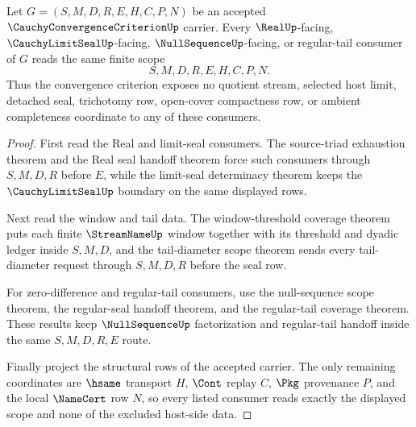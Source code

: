 \begin{theorem}
\label{thm:cauchy-convergence-criterion-scoped-readback-strengthening}
Let $G=(S,M,D,R,E,H,C,P,N)$ be an accepted $\CauchyConvergenceCriterionUp$ carrier. Every $\RealUp$-facing, $\CauchyLimitSealUp$-facing, $\NullSequenceUp$-facing, or regular-tail consumer of $G$ reads the same finite scope
$$
S,M,D,R,E,H,C,P,N.
$$
Thus the convergence criterion exposes no quotient stream, selected host limit, detached seal, trichotomy row, open-cover compactness row, or ambient completeness coordinate to any of these consumers.
\end{theorem}
\begin{proof}
First read the Real and limit-seal consumers. The source-triad exhaustion theorem and the Real seal handoff theorem force such consumers through $S,M,D,R$ before $E$, while the limit-seal determinacy theorem keeps the $\CauchyLimitSealUp$ boundary on the same displayed rows.

Next read the window and tail data. The window-threshold coverage theorem puts each finite $\StreamNameUp$ window together with its threshold and dyadic ledger inside $S,M,D$, and the tail-diameter scope theorem sends every tail-diameter request through $S,M,D,R$ before the seal row.

For zero-difference and regular-tail consumers, use the null-sequence scope theorem, the regular-seal handoff theorem, and the regular-tail coverage theorem. These results keep $\NullSequenceUp$ factorization and regular-tail handoff inside the same $S,M,D,R,E$ route.

Finally project the structural rows of the accepted carrier. The only remaining coordinates are $\hsame$ transport $H$, $\Cont$ replay $C$, $\Pkg$ provenance $P$, and the local $\NameCert$ row $N$, so every listed consumer reads exactly the displayed scope and none of the excluded host-side data.
\end{proof}

